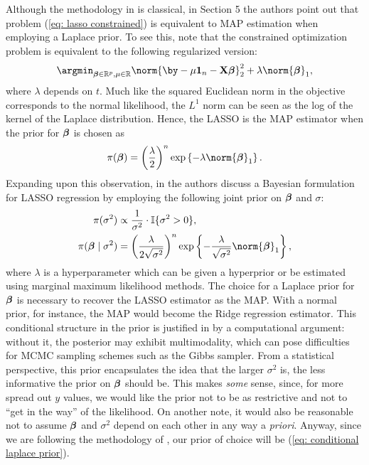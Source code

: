 \documentclass[a4paper, 10pt]{article}
\begin{document}
Although the methodology in \cite{tibshirani1994lasso} is classical, in Section 5 the authors point out that problem (\ref{eq: lasso constrained}) is equivalent to MAP estimation when employing a Laplace prior.
To see this, note that the constrained optimization problem is equivalent to the following regularized version:
\begin{equation*}
    \argmin_{ \betabold \in \R^{ p }, \mu \in \R } \norm{ \by - \mu \ones_{ n } - \bX \betabold }_{ 2 }^{ 2 } + \lambda \norm{ \betabold }_{ 1 }
,\end{equation*}
where $ \lambda $ depends on $ t $.
Much like the squared Euclidean norm in the objective corresponds to the normal likelihood, the $ L^1 $ norm can be seen as the log of the kernel of the Laplace distribution.
Hence, the LASSO is the MAP estimator when the prior for $ \boldsymbol{\beta} $ is chosen as
\begin{equation*}
    \pi ( \betabold ) = \left( \frac{ \lambda }{ 2 } \right)^n \exp \left\{ - \lambda \norm{ \betabold }_{ 1 } \right\}
.\end{equation*}
Expanding upon this observation, in \cite{parkcasella2008bayesianlasso} the authors discuss a Bayesian formulation for LASSO regression by employing the following joint prior on $ \boldsymbol{\beta} $ and $ \sigma $:
\begin{align}
    \begin{split}
        \pi ( \sigma^2 ) &\propto \frac{ 1 }{ \sigma^2 } \cdot \ind \{ \sigma^2 > 0 \}, \\
        \pi ( \betabold \mid \sigma^2 ) &= \left( \frac{ \lambda }{ 2 \sqrt{ \sigma^2 } } \right)^{ n } \exp \left\{ - \frac{ \lambda }{ \sqrt{ \sigma^2 } } \norm{ \betabold }_{ 1 } \right\},
    \end{split}
    \label{eq: conditional laplace prior}
\end{align}
where $ \lambda $ is a hyperparameter which can be given a hyperprior or be estimated using marginal maximum likelihood methods.
The choice for a Laplace prior for $ \boldsymbol{\beta} $ is necessary to recover the LASSO estimator as the MAP.
With a normal prior, for instance, the MAP would become the Ridge regression estimator.
This conditional structure in the prior is justified in \cite{parkcasella2008bayesianlasso} by a computational argument: without it, the posterior may exhibit multimodality, which can pose difficulties for MCMC sampling schemes such as the Gibbs sampler.
From a statistical perspective, this prior encapsulates the idea that the larger $ \sigma^2 $ is, the less informative the prior on $ \boldsymbol{\beta} $ should be.
This makes \emph{some} sense, since, for more spread out $ y $ values, we would like the prior not to be as restrictive and not to ``get in the way'' of the likelihood.
On another note, it would also be reasonable not to assume $ \boldsymbol{\beta} $ and $ \sigma^2 $ depend on each other in any way a \emph{priori}.
Anyway, since we are following the methodology of \cite{parkcasella2008bayesianlasso}, our prior of choice will be (\ref{eq: conditional laplace prior}).
\end{document}
